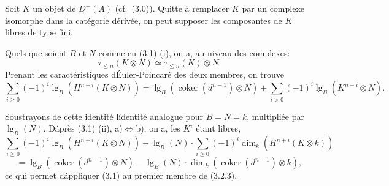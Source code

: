 \documentclass[12pt]{amsart}
\theoremstyle{plain}
\theoremstyle{remark}
\DeclareMathOperator{\coker}{coker}
\DeclareMathOperator{\lgB}{lg}
\newcommand{\dm}{D^-}
\begin{document}
Soit $K$ un objet de $\dm(A)$ (cf.~(3.0)). Quitte \`a remplacer $K$ par un complexe isomorphe dans la cat\'egorie d\'eriv\'ee, on peut supposer les composantes de $K$ libres de type fini.

Quels que soient $B$ et $N$ comme en (3.1) (i), on a, au niveau des complexes:
\[
\tau_{\leq n}(K \otimes N) \simeq \tau_{\leq n}(K) \otimes N.
\]
Prenant les caract\'eristiques d\'Euler-Poincar\'e des deux membres, on trouve
\[
\sum_{i \geq 0} (-1)^i \lgB_B(H^{n+i}(K \otimes N)) = \lgB_B(\coker(d^{n-1}) \otimes N) + \sum_{i > 0} (-1)^i \lgB_B(K^{n+i} \otimes N).
\]

Soustrayons de cette identit\'e l\'identit\'e analogue pour $B = N = k$, multipli\'ee par $\lgB_B(N)$. D\'apr\`es (3.1) (ii), a)$\Leftrightarrow$b), on a, les $K^i$ \'etant libres,
\begin{equation}\label{eq:3.2.3}
\sum_{i \geq 0} (-1)^i \lgB_B(H^{n+i}(K \otimes N)) - \lgB_B(N) \cdot \sum_{i \geq 0} (-1)^i \dim_k(H^{n+i}(K \otimes k))
\end{equation}
\[
= \lgB_B(\coker(d^{n-1}) \otimes N) - \lgB_B(N) \cdot \dim_k(\coker(d^{n-1}) \otimes k),
\]
ce qui permet d\'appliquer (3.1) au premier membre de (3.2.3).
\end{document}
